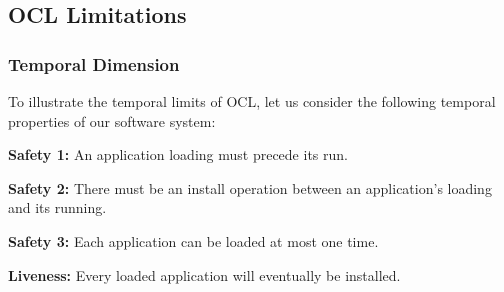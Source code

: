 \subsection{OCL Limitations}

\subsubsection{Temporal Dimension}
To illustrate the temporal limits of OCL, let us consider the following temporal 
properties of our software system: 
    
\begin{mdframed}
    \item \textbf{Safety 1:} An application loading must precede its run.
    \item \textbf{Safety 2:} There must be an install operation between an application's loading and its running.
    \item \textbf{Safety 3:} Each application can be loaded at most one time.
    \item \textbf{Liveness:} Every loaded application will eventually be installed.
    \label{fig:temporal_properties}
\end{mdframed}

